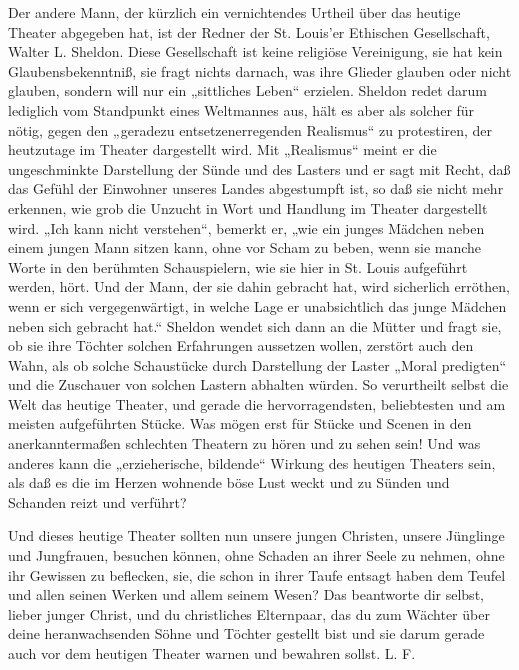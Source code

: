 Der andere Mann, der kürzlich ein vernichtendes Urtheil über das heutige Theater abgegeben hat, ist der Redner der St. Louis'er Ethischen Gesellschaft, Walter L. Sheldon. Diese Gesellschaft ist keine religiöse Vereinigung, sie hat kein Glaubensbekenntniß, sie fragt nichts darnach, was ihre Glieder glauben oder nicht glauben, sondern will nur ein „sittliches Leben“ erzielen. Sheldon redet darum lediglich vom Standpunkt eines Weltmannes aus, hält es aber als solcher für nötig, gegen den „geradezu entsetzenerregenden Realismus“ zu protestiren, der heutzutage im Theater dargestellt wird. Mit „Realismus“ meint er die ungeschminkte Darstellung der Sünde und des Lasters und er sagt mit Recht, daß das Gefühl der Einwohner unseres Landes abgestumpft ist, so daß sie nicht mehr erkennen, wie grob die Unzucht in Wort und Handlung im Theater dargestellt wird. „Ich kann nicht verstehen“, bemerkt er, „wie ein junges Mädchen neben einem jungen Mann sitzen kann, ohne vor Scham zu beben, wenn sie manche Worte in den berühmten Schauspielern, wie sie hier in St. Louis aufgeführt werden, hört. Und der Mann, der sie dahin gebracht hat, wird sicherlich erröthen, wenn er sich vergegenwärtigt, in welche Lage er unabsichtlich das junge Mädchen neben sich gebracht hat.“ Sheldon wendet sich dann an die Mütter und fragt sie, ob sie ihre Töchter solchen Erfahrungen aussetzen wollen, zerstört auch den Wahn, als ob solche Schaustücke durch Darstellung der Laster „Moral predigten“ und die Zuschauer von solchen Lastern abhalten würden. So verurtheilt selbst die Welt das heutige Theater, und gerade die hervorragendsten, beliebtesten und am meisten aufgeführten Stücke. Was mögen erst für Stücke und Scenen in den anerkanntermaßen schlechten Theatern zu hören und zu sehen sein! Und was anderes kann die „erzieherische, bildende“ Wirkung des heutigen Theaters sein, als daß es die im Herzen wohnende böse Lust weckt und zu Sünden und Schanden reizt und verführt?

Und dieses heutige Theater sollten nun unsere jungen Christen, unsere Jünglinge und Jungfrauen, besuchen können, ohne Schaden an ihrer Seele zu nehmen, ohne ihr Gewissen zu beflecken, sie, die schon in ihrer Taufe entsagt haben dem Teufel und allen seinen Werken und allem seinem Wesen? Das beantworte dir selbst, lieber junger Christ, und du christliches Elternpaar, das du zum Wächter über deine heranwachsenden Söhne und Töchter gestellt bist und sie darum gerade auch vor dem heutigen Theater warnen und bewahren sollst. L. F.
